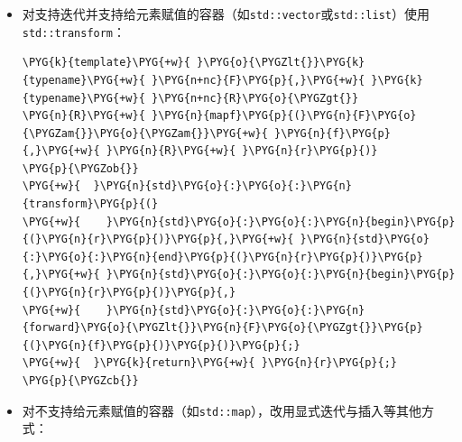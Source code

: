 \begin{itemize}
\item 对支持迭代并支持给元素赋值的容器（如\texttt{std::\allowbreak{}vector}或\texttt{std::\allowbreak{}list}）使用\texttt{std::\allowbreak{}transform}：



\begin{codeblockbg}
\begin{Verbatim}[commandchars=\\\{\},breaklines=true,breakanywhere=true,fontsize=\codefont,xleftmargin=17bp]
\PYG{k}{template}\PYG{+w}{ }\PYG{o}{\PYGZlt{}}\PYG{k}{typename}\PYG{+w}{ }\PYG{n+nc}{F}\PYG{p}{,}\PYG{+w}{ }\PYG{k}{typename}\PYG{+w}{ }\PYG{n+nc}{R}\PYG{o}{\PYGZgt{}}
\PYG{n}{R}\PYG{+w}{ }\PYG{n}{mapf}\PYG{p}{(}\PYG{n}{F}\PYG{o}{\PYGZam{}}\PYG{o}{\PYGZam{}}\PYG{+w}{ }\PYG{n}{f}\PYG{p}{,}\PYG{+w}{ }\PYG{n}{R}\PYG{+w}{ }\PYG{n}{r}\PYG{p}{)}
\PYG{p}{\PYGZob{}}
\PYG{+w}{  }\PYG{n}{std}\PYG{o}{:}\PYG{o}{:}\PYG{n}{transform}\PYG{p}{(}
\PYG{+w}{    }\PYG{n}{std}\PYG{o}{:}\PYG{o}{:}\PYG{n}{begin}\PYG{p}{(}\PYG{n}{r}\PYG{p}{)}\PYG{p}{,}\PYG{+w}{ }\PYG{n}{std}\PYG{o}{:}\PYG{o}{:}\PYG{n}{end}\PYG{p}{(}\PYG{n}{r}\PYG{p}{)}\PYG{p}{,}\PYG{+w}{ }\PYG{n}{std}\PYG{o}{:}\PYG{o}{:}\PYG{n}{begin}\PYG{p}{(}\PYG{n}{r}\PYG{p}{)}\PYG{p}{,}
\PYG{+w}{    }\PYG{n}{std}\PYG{o}{:}\PYG{o}{:}\PYG{n}{forward}\PYG{o}{\PYGZlt{}}\PYG{n}{F}\PYG{o}{\PYGZgt{}}\PYG{p}{(}\PYG{n}{f}\PYG{p}{)}\PYG{p}{)}\PYG{p}{;}
\PYG{+w}{  }\PYG{k}{return}\PYG{+w}{ }\PYG{n}{r}\PYG{p}{;}
\PYG{p}{\PYGZcb{}}
\end{Verbatim}
\end{codeblockbg}



\item 对不支持给元素赋值的容器（如\texttt{std::\allowbreak{}map}），改用显式迭代与插入等其他方式：




\end{itemize}
